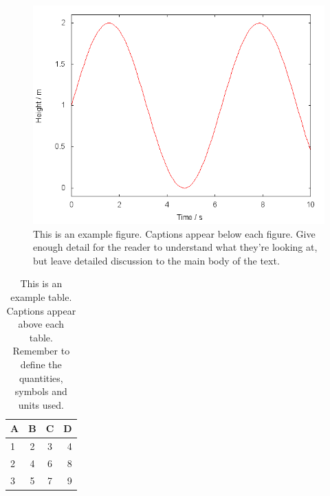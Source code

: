 \documentclass[fleqn,usenatbib]{mnras}
\begin{document}
\begin{figure}
	\includegraphics[width=\columnwidth]{example}
    \caption{This is an example figure. Captions appear below each figure.
	Give enough detail for the reader to understand what they're looking at,
	but leave detailed discussion to the main body of the text.}
    \label{fig:example_figure}
\end{figure}

\begin{table}
	\centering
	\caption{This is an example table. Captions appear above each table.
	Remember to define the quantities, symbols and units used.}
	\label{tab:example_table}
	\begin{tabular}{lccr} %
		\hline
		A & B & C & D\\
		\hline
		1 & 2 & 3 & 4\\
		2 & 4 & 6 & 8\\
		3 & 5 & 7 & 9\\
		\hline
	\end{tabular}
\end{table}

\fi


\bsp	%
\label{lastpage}
\end{document}
